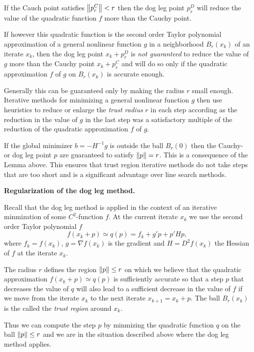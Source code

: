 \medskip\noindent
If the Cauch point satisfies $\left\|p^C_r\right\|<r$ then the dog leg point $p^D_r$ will reduce
the value of the quadratic function $f$ more than the Cauchy point.

If however this quadratic function is the second order Taylor polynomial approximation of
a general nonlinear function $g$ in a neighborhood $B_r(x_k)$ of an iterate $x_k$, then 
the dog leg point $x_k+p^D_r$ is \textit{not guaranteed} to reduce the value of $g$ more  
than the Cauchy point $x_k+p^C_r$ and will do so only if the quadratic approximation $f$
of $g$ on $B_r(x_k)$ is accurate enough.

Generally this can be guaranteed only by making the radius $r$ small enough. Iterative methods
for minimizing a general nonlinear function $g$ then use heuristics to reduce or enlarge the 
\textit{trust radius} $r$ in each step according as the reduction in the value of $g$ in the 
last step was a satisfactory multiple of the reduction of the quadratic approximation $f$
of $g$.

If the global minimizer $b=-H^{-1}g$ is outside the ball $B_r(0)$ then the Cauchy- or dog leg 
point $p$ are guaranteed to satisfy $\left\|p\right\|=r$. This is a consequence of the Lemma above.
This ensures that trust region iterative methods do not take steps that are too short and is  
a significant advantage over line search methods.





\medskip\noindent
\textbf{Regularization of the dog leg method.}
\label{sec:dog_leg_regularized}

Recall that the dog leg method is applied in the context of an iterative 
minmization of some $C^2$-function $f$. At the current iterate $x_k$ we 
use the second order Taylor polynomial $f$
$$
f(x_k+p)\simeq q(p)=f_k+g'p+p'Hp,
$$
where $f_k=f(x_k)$, $g=\nabla f(x_k)$ is the gradient and 
$H=D^2f(x_k)$ the Hessian of $f$ at the iterate $x_k$.

The radius $r$ defines the region $\left\|p\right\|\leq r$ on which we believe that
the quadratic approximation $f(x_k+p)\simeq q(p)$ is sufficiently accurate
so that a step $p$ that decreases the value of $q$ will also lead to a 
sufficient decrease in the value of $f$ if we move from the iterate $x_k$ 
to the next iterate $x_{k+1}=x_k+p$. The ball $B_r(x_k)$ is the called the 
\textit{trust region} around $x_k$.

Thus we can compute the step $p$ by minmizing the quadratic function $q$ on 
the ball $\left\|p\right\|\leq r$ and we are in the situation described above where the
dog leg method applies. 

